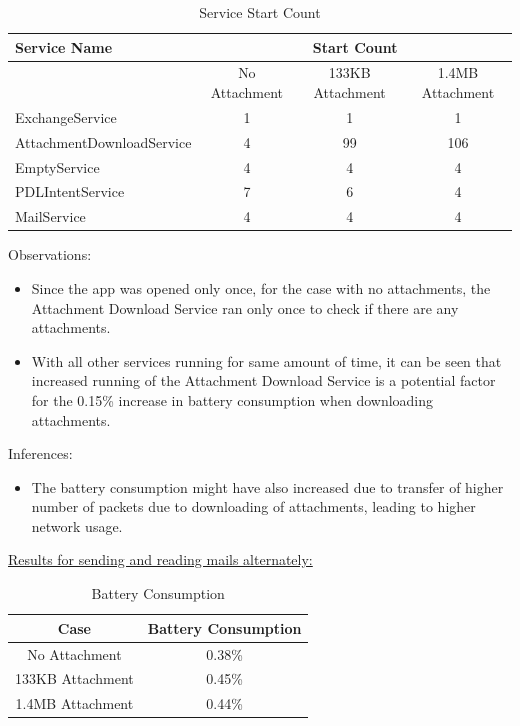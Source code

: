 \begin{table}[!h]
\centering
\caption{Service Start Count}
\label{my-label}
\begin{tabular}{|l|c|c|c|}
\hline
Service Name              & \multicolumn{3}{c|}{Start Count}                    \\ \hline
                          & No Attachment & 133KB Attachment & 1.4MB Attachment \\ \hline
ExchangeService           & 1             & 1                & 1                \\ \hline
AttachmentDownloadService & 4             & 99               & 106              \\ \hline
EmptyService              & 4             & 4                & 4                \\ \hline
PDLIntentService          & 7             & 6                & 4                \\ \hline
MailService               & 4             & 4                & 4                \\ \hline
\end{tabular}
\end{table}
\pagebreak
Observations: 
\begin{itemize}
	\item Since the app was opened only once, for the case with no attachments, the Attachment Download Service ran only once to check if there are any attachments. 
	\item With all other services running for same amount of time, it can be seen that increased running of the Attachment Download Service is a potential factor for the 0.15\% increase in battery consumption when downloading attachments. 
\end{itemize}
Inferences:
\begin{itemize}
	\item The battery consumption might have also increased due to transfer of higher number of packets due to downloading of attachments, leading to higher network usage.
\end{itemize}
\underline{Results for sending and reading mails alternately: }\\
\begin{table}[!h]
\centering
\caption{Battery Consumption}
\begin{tabular}{|c|c|}
\hline
Case & Battery Consumption\\ \hline
No Attachment & 0.38\%\\ \hline
133KB Attachment & 0.45\% \\ \hline
1.4MB Attachment & 0.44\% \\ \hline 
\end{tabular}
\end{table}
